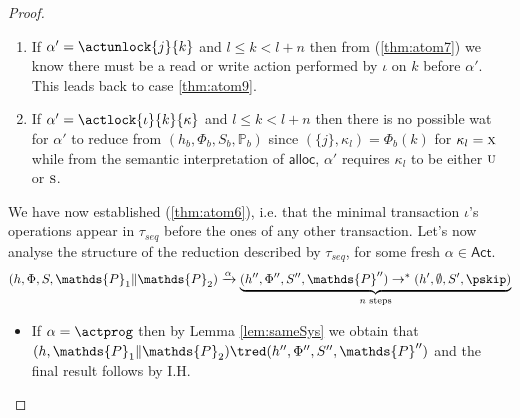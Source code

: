 {\begin{proof}
\begin{enumerate}[label=({\roman*})]
	\item If $\alpha' = \actunlock{j}{k}$ and $l \leq k < l + n$ then from (\ref{thm:atom7}) we know there must be a \textsf{read} or \textsf{write} action performed by $\iota$ on $k$ before $\alpha'$. This leads back to case \ref{thm:atom9}.
	
	\item If $\alpha' = \actlock{\iota}{k}{\kappa}$ and $l \leq k < l + n$ then there is no possible wat for $\alpha'$ to reduce from $(h_b, \Phi_b, S_b, \mathds{P}_b)$ since $(\{j\}, \kappa_l) = \Phi_b(k)$ for $\kappa_l = \textsc{x}$ while from the semantic interpretation of $\mathsf{alloc}$, $\alpha'$ requires $\kappa_l$ to be either $\textsc{u}$ or $\textsc{s}$.
\end{enumerate}

We have now established (\ref{thm:atom6}), i.e. that the minimal transaction $\iota$'s operations appear in $\tau_{seq}$ before the ones of any other transaction. Let's now analyse the structure of the reduction described by $\tau_{seq}$, for some fresh $\alpha \in \mathsf{Act}$.
\[
	(h, \Phi, S, \mathds{P}_1 \| \mathds{P}_2) \xrightarrow{\alpha}
	\underbrace{(h'', \Phi'', S'', \mathds{P}'') \rightarrow^* (h', \emptyset, S', \pskip)}_{n \text{ steps}}
\]
\begin{itemize}
	\item If $\alpha = \actprog$ then by Lemma \ref{lem:sameSys} we obtain that $(h, \mathds{P}_1 \| \mathds{P}_2) \tred (h'', \Phi'', S'', \mathds{P}'')$ and the final result follows by I.H.
	

\end{itemize}
\end{proof}}
